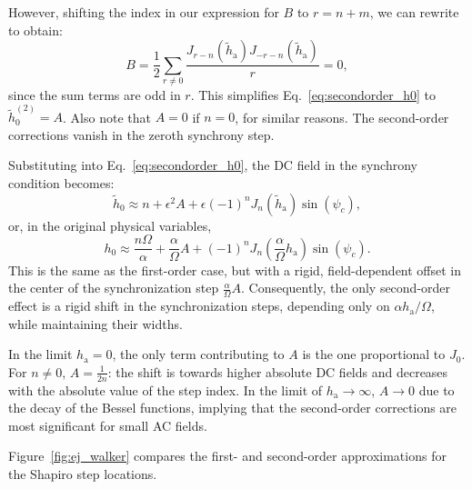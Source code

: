 \documentclass[prb,aps,twocolumn,superscriptaddress,floatfix]{revtex4-2}
\begin{document}
However, shifting the index in our expression for $B$ to $r=n+m$, we can rewrite to obtain:
\begin{equation}
    B=\frac{1}{2}\sum_{r\neq 0} \frac{J_{r-n}(\tilde h_\text{a})J_{-r-n}(\tilde h_\text{a})}{r}=0,
\end{equation}
since the sum terms are odd in $r$. This simplifies Eq.~\eqref{eq:secondorder_h0} to $\tilde{h}_0^{(2)}=A$. Also note that $A=0$ if $n=0$, for similar reasons. The second-order corrections vanish in the zeroth synchrony step.

Substituting into Eq.~\eqref{eq:secondorder_h0}, the DC field in the synchrony condition becomes:
\begin{equation}
    \tilde h_0 \approx n + \epsilon^2A + \epsilon(-1)^n J_n(\tilde h_\text{a})\sin(\psi_c),
\end{equation}
or, in the original physical variables,
\begin{equation}
    h_0 \approx \frac{n\Omega}{\alpha} + \frac{\alpha}{\Omega}A + (-1)^n J_n\left(\frac{\alpha}{\Omega} h_\text{a}\right)\sin(\psi_c).
    \label{eq:h0_2order}
\end{equation}
This is the same as the first-order case, but with a rigid, field-dependent offset in the center of the synchronization step $\frac{\alpha}{\Omega}A$. Consequently, the only second-order effect is a rigid shift in the synchronization steps, depending only on $\alpha h_\text {a}/\Omega$, while maintaining their widths.

In the limit $h_\text{a}=0$, the only term contributing to $A$ is the one proportional to $J_0$. For $n\neq0$, $A=\frac{1}{2n}$: the shift is towards higher absolute DC fields and decreases with the absolute value of the step index. In the limit of $h_\text{a}\to\infty$, $A\to 0$ due to the decay of the Bessel functions, implying that the second-order corrections are most significant for small AC fields.

Figure~\ref{fig:ej_walker} compares the first- and second-order approximations for the Shapiro step locations.


\end{document}
